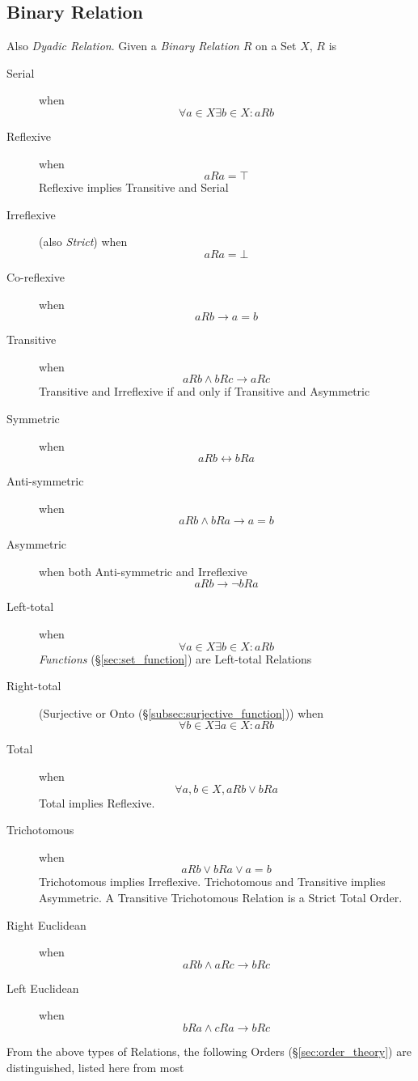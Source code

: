 \documentclass{article}
\begin{document}
\subsection{Binary Relation}\label{subsec:binary_relation}

Also \emph{Dyadic Relation}. Given a \emph{Binary Relation} $R$ on a
Set $X$, $R$ is
\begin{description}
\item[Serial] when
\[
    \forall a \in X \exists b \in X : aRb
\]
\item[Reflexive] when
\[
    aRa = \top
\]
Reflexive implies Transitive and Serial
\item[Irreflexive] (also \emph{Strict}) when
\[
    aRa = \bot
\]
\item[Co-reflexive] when
\[
    aRb \rightarrow a = b
\]
\item[Transitive] when
\[
    aRb \wedge bRc \rightarrow aRc
\]
Transitive and Irreflexive if and only if Transitive and Asymmetric
\item[Symmetric] when
\[
    aRb \leftrightarrow bRa
\]
\item[Anti-symmetric] when
\[
    aRb \wedge bRa \rightarrow a = b
\]
\item[Asymmetric] when both Anti-symmetric and Irreflexive
\[
    aRb \rightarrow \neg bRa
\]
\item[Left-total] when
\[
    \forall a \in X \exists b \in X : aRb
\]
\emph{Functions} (\S\ref{sec:set_function}) are Left-total Relations
\item[Right-total] (Surjective or Onto
  (\S\ref{subsec:surjective_function})) when
\[
    \forall b \in X \exists a \in X : aRb
\]
\item[Total] when
\[
    \forall a,b \in X, aRb \vee bRa
\]
Total implies Reflexive.
\item[Trichotomous] when
\[
    aRb \vee bRa \vee a = b
\]
Trichotomous implies Irreflexive.
Trichotomous and Transitive implies Asymmetric.
A Transitive Trichotomous Relation is a Strict Total Order.
\item[Right Euclidean] when
\[
    aRb \wedge aRc \rightarrow bRc
\]
\item[Left Euclidean] when
\[
    bRa \wedge cRa \rightarrow bRc
\]
\end{description}
From the above types of Relations, the following Orders
(\S\ref{sec:order_theory}) are distinguished, listed here from most
\end{document}
